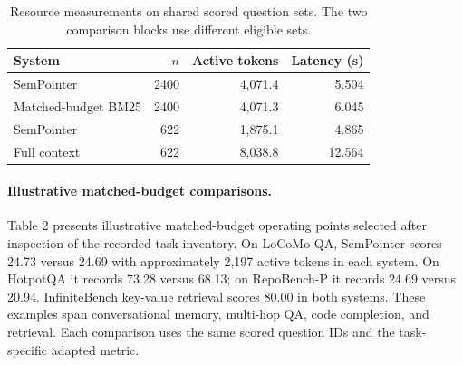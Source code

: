 \begin{table}[t]\centering\small\setlength{\tabcolsep}{3pt}
\caption{Resource measurements on shared scored question sets. The two comparison blocks use different eligible sets.}
\label{tab:kaggle_resources}
\begin{tabular}{lrrr}\toprule
System & $n$ & Active tokens & Latency (s) \\ \midrule
SemPointer & 2400 & 4,071.4 & 5.504 \\
Matched-budget BM25 & 2400 & 4,071.3 & 6.045 \\
\midrule
SemPointer & 622 & 1,875.1 & 4.865 \\
Full context & 622 & 8,038.8 & 12.564 \\
\bottomrule\end{tabular}\end{table}
\paragraph{Illustrative matched-budget comparisons.}
Table 2 presents illustrative matched-budget operating points selected after inspection of the recorded task inventory. On LoCoMo QA, SemPointer scores 24.73 versus 24.69 with approximately 2,197 active tokens in each system. On HotpotQA it records 73.28 versus 68.13; on RepoBench-P it records 24.69 versus 20.94. InfiniteBench key-value retrieval scores 80.00 in both systems. These examples span conversational memory, multi-hop QA, code completion, and retrieval. Each comparison uses the same scored question IDs and the task-specific adapted metric.


